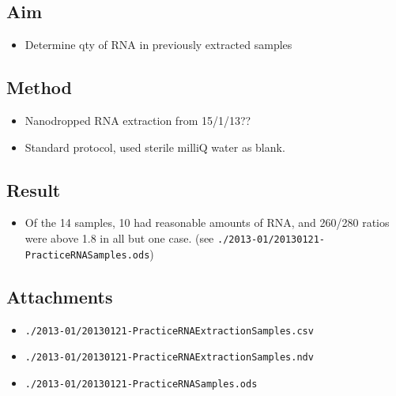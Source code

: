 \documentclass[12pt,a4paper]{book}
\begin{document}
    \subsection*{Aim}
      \begin{itemize} \itemsep1pt \parskip0pt 
        \item Determine qty of RNA in previously extracted samples
      \end{itemize}

    \subsection*{Method}
      \begin{itemize} \itemsep1pt \parskip0pt 
        \item Nanodropped RNA extraction from 15/1/13??
        \item Standard protocol, used sterile milliQ water as blank.
      \end{itemize}

    \subsection*{Result}
      \begin{itemize} \itemsep1pt \parskip0pt 
        \item Of the 14 samples, 10 had reasonable amounts of RNA, and 260/280 ratios were above 1.8 in all but one case.
        (see \verb+./2013-01/20130121-PracticeRNASamples.ods+)
      \end{itemize}

    \subsection*{Attachments}
      \begin{itemize} \itemsep1pt \parskip0pt 
        \item \verb+./2013-01/20130121-PracticeRNAExtractionSamples.csv+
        \item \verb+./2013-01/20130121-PracticeRNAExtractionSamples.ndv+
        \item \verb+./2013-01/20130121-PracticeRNASamples.ods+
      \end{itemize}
\end{document}
